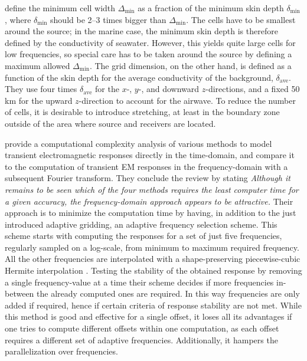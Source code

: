 \documentclass[onecolumn,extra,referee,camera]{gji}
\begin{document}
\cite{GEO.07.Plessix} define the minimum cell width $\Delta_\mathrm{min}$ as a
fraction of the minimum skin depth $\delta_\mathrm{min}$, where
$\delta_\mathrm{min}$ should be 2--3 times bigger than $\Delta_\mathrm{min}$.
The cells have to be smallest around the source; in the marine case, the
minimum skin depth is therefore defined by the conductivity of seawater.
However, this yields quite large cells for low frequencies, so special care has
to be taken around the source by defining a maximum allowed
$\Delta_\mathrm{min}$. The grid dimension, on the other hand, is defined as a
function of the skin depth for the average conductivity of the background,
$\delta_\mathrm{ave}$. They use four times $\delta_\mathrm{ave}$ for the $x$-,
$y$-, and downward $z$-directions, and a fixed 50\,km for the upward
$z$-direction to account for the airwave. To reduce the number of cells, it is
desirable to introduce stretching, at least in the boundary zone outside of the
area where source and receivers are located.

\cite{GEO.08.Mulder} provide a computational complexity analysis of various
methods to model transient electromagnetic responses directly in the
time-domain, and compare it to the computation of transient EM responses in the
frequency-domain with a subsequent Fourier transform. They conclude the review
by stating \emph{\guillemotleft Although it remains to be seen which of the
four methods requires the least computer time for a given accuracy, the
frequency-domain approach appears to be attractive.\guillemotright} Their
approach is to minimize the computation time by having, in addition to the just
introduced adaptive gridding, an adaptive frequency selection scheme. This
scheme starts with computing the responses for a set of just five frequencies,
regularly sampled on a log-scale, from minimum to maximum required frequency.
All the other frequencies are interpolated with a shape-preserving
piecewise-cubic Hermite interpolation \citep[PCHIP, ][]{SIAM.80.Fritsch}.
Testing the stability of the obtained response by removing a single
frequency-value at a time their scheme decides if more frequencies in-between
the already computed ones are required. In this way frequencies are only added
if required, hence if certain criteria of response stability are not met. While
this method is good and effective for a single offset, it loses all its
advantages if one tries to compute different offsets within one computation, as
each offset requires a different set of adaptive frequencies. Additionally, it
hampers the parallelization over frequencies.
\end{document}
